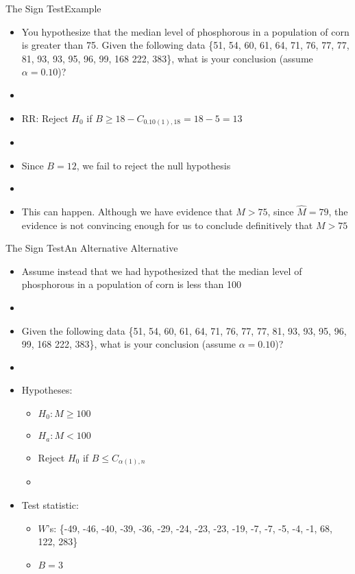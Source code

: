 \documentclass[xcolor=dvipsnames]{beamer}
\begin{document}
\begin{frame}{The Sign Test}{Example}
\begin{itemize}
	\item You hypothesize that the median level of phosphorous in a population of corn is greater than 75. Given the following data \{51, 54, 60, 61, 64, 71, 76, 77, 77, 81, 93, 93, 95, 96, 99, 168 222, 383\}, what is your conclusion (assume $\alpha = 0.10$)?
	\item[]
	\item RR: Reject $H_0$ if $B \geq 18 - C_{0.10(1), 18} = 18 - 5 = 13$
	\item[]
	\item Since $B = 12$, we fail to reject the null hypothesis
	\item[]
	\item This can happen. Although we have evidence that $M > 75$, since $\hat{M} = 79$, the evidence is not convincing enough for us to conclude definitively that $M > 75$
\end{itemize}
\end{frame}

\begin{frame}{The Sign Test}{An Alternative Alternative}
	\begin{itemize}
		\item Assume instead that we had hypothesized that the median level of phosphorous in a population of corn is less than 100
		\item[]
		\item Given the following data \{51, 54, 60, 61, 64, 71, 76, 77, 77, 81, 93, 93, 95, 96, 99, 168 222, 383\}, what is your conclusion (assume $\alpha = 0.10$)?
		\item[]
		\item Hypotheses:
		\begin{itemize}
			\item $H_0: M \geq 100$
			\item $H_a: M < 100$
			\item Reject $H_0$ if $B \leq C_{\alpha(1), n}$
			\item[]
		\end{itemize}
	\item Test statistic:
	\begin{itemize}
		\item $W$'s: \{-49, -46, -40, -39, -36, -29, -24, -23, -23, -19, -7, -7, -5, -4, -1, 68, 122, 283\}
		\item $B = 3$
	\end{itemize}
	\end{itemize}
\end{frame}
\end{document}
